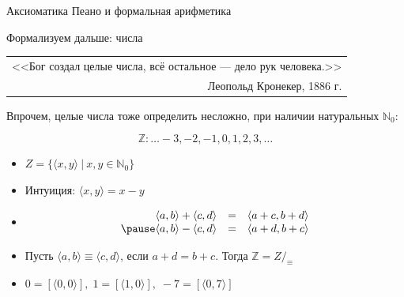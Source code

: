 \documentclass[aspectratio=169]{beamer}
\begin{document}
\begin{frame}
\begin{center}{\LARGE Аксиоматика Пеано и формальная арифметика}\end{center}

\end{frame}


\begin{frame}{Формализуем дальше: числа}

{\itshape \hfill \begin{tabular}{r} <<Бог создал целые числа, всё остальное — дело рук человека.>>\\
                                 Леопольд Кронекер, 1886 г.\end{tabular}}\pause

\vspace{0.1cm}
Впрочем, целые числа тоже определить несложно, при наличии натуральных $\mathbb{N}_0$:
\vspace{-0.1cm}

 $$\mathbb{Z}: \dots -3, -2, -1, 0, 1, 2, 3, \dots$$\pause\vspace{-0.5cm}
\begin{itemize}
\item     $Z = \{\langle x, y \rangle\ |\ x,y\in \mathbb{N}_0\}$ \pause
\item Интуиция: $\langle x,y\rangle = x-y$\pause
\item $$\begin{array}{rcl}
      \langle a, b \rangle + \langle c, d \rangle & = & \langle a + c, b + d \rangle \\ \pause
      \langle a, b \rangle - \langle c, d \rangle & = & \langle a + d, b + c \rangle 
  \end{array}$$\pause
\item     Пусть $\langle a, b \rangle \equiv \langle c,d\rangle$, если $a + d = b + c$. Тогда $\mathbb{Z} = Z/_\equiv$\pause
\item      $0 = [\langle 0,0 \rangle],\; 1 = [\langle 1,0\rangle],\; -7 = [\langle 0,7 \rangle]$

\end{itemize}
\end{frame}
\end{document}
